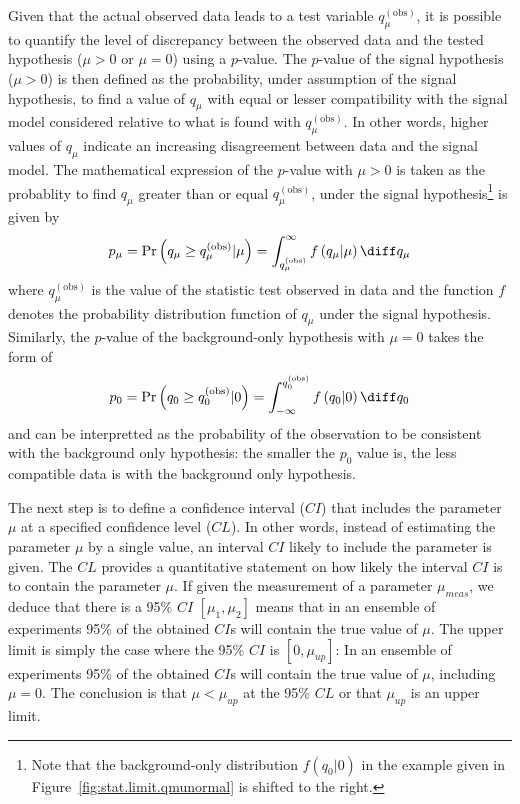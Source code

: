 Given that the actual observed data leads to a test variable $q_{\mu}^{\left(\text{obs}\right)}$, it is possible to 
quantify the level of discrepancy between the observed data and the tested hypothesis ($\mu>0$ or $\mu=0$) using 
a $p$-value. 
The $p$-value of the signal hypothesis ($\mu>0$) is then defined as the probability, under assumption of the signal hypothesis, 
to find a value of $q_{\mu}$ with equal or lesser compatibility with the signal model considered relative to what is 
found with $q_{\mu}^{\left(\text{obs}\right)}$. In other words,  higher values of $q_{\mu}$ indicate an increasing disagreement
between data and the signal model. The mathematical expression of the $p$-value with $\mu>0$ is taken as the probablity 
to find $q_{\mu}$ greater than or equal $q_{\mu}^{\left(\text{obs}\right)}$, under the signal hypothesis\footnote{Note that 
 the background-only distribution $f\left(q_{0} \rvert 0\right)$ in the example given in 
Figure~\ref{fig:stat.limit.qmunormal} is shifted to the right.} is given by
\begin{equation}
p_{\mu} = \Pr\left(q_{\mu} \geq q_{\mu}^{\left(\text{obs}\right)} \rvert \mu \right) = \int_{q_{\mu}^{\left(\text{obs}\right)}}^{\infty} f\left(q_{\mu} \rvert \mu\right) \diff q_{\mu}
\end{equation}
where $q_{\mu}^{\left(\text{obs}\right)}$ is the value of the statistic test observed in data and the function $f$
denotes the probability distribution function of $q_{\mu}$ under the signal hypothesis. 
Similarly, the $p$-value of the background-only hypothesis with $\mu=0$ takes the form of 
\begin{equation}
p_{0} = \Pr\left(q_{0} \geq q_{0}^{\left(\text{obs}\right)} \rvert 0 \right) = \int^{q_{0}^{\left(\text{obs}\right)}}_{-\infty} f\left(q_{0} \rvert 0\right) \diff q_{0}
\end{equation}
and can be interpretted as the probability of the observation to be consistent with the background only hypothesis:
the smaller the $p_{0}$ value is, the less compatible data is with the background only hypothesis. 


The next step is to define a confidence interval ($CI$) that includes the parameter $\mu$ at a specified confidence level ($CL$). 
In other words, instead of estimating the parameter $\mu$ by a single value, an interval $CI$ likely to include the parameter is given.
The $CL$ provides a quantitative statement on how likely the interval $CI$ is to contain the parameter $\mu$. 
If given the measurement of a parameter $\mu_{meas}$, we deduce that there is a 95\% $CI$ $[\mu_1,\mu_2]$ means 
that in an ensemble of experiments 95\% of the obtained $CI$s will contain the true value of $\mu$.
The upper limit is simply the case where the 95\% $CI$ is $[0,\mu_{up}]$:
In an ensemble of experiments 95\% of the obtained $CI$s will contain the true value of $\mu$, including $\mu=0$. 
The conclusion is that $\mu < \mu_{up}$ at the 95\% $CL$ or that $ \mu_{up}$ is an upper limit. 

